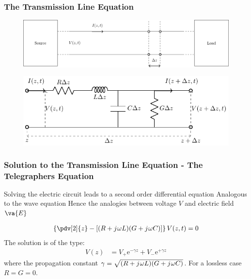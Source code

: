 \documentclass[10pt, compress]{beamer}
\renewcommand{\O}{\omega}  %
\newcommand{\e}{\mathrm{e}} %
\renewcommand{\j}{{j}\mkern1mu} %
\begin{document}
\begin{frame}
  \frametitle{The Transmission Line Equation}

\begin{figure}
  \centering
  \includegraphics[width=.85\textwidth]{tlines.pdf}
  \end{figure}
  \begin{figure}
    \centering
    \includegraphics[width=.85\textwidth]{circuit2.pdf}
      \end{figure}
\end{frame}

\begin{frame}
  \frametitle{Solution to the Transmission Line Equation - The Telegraphers Equation}
\begin{outline}
  \1 Solving the electric circuit leads to a second order differential equation
  \1 Analogous to the wave equation
  \2 Hence the analogies between voltage $V$ and electric field $\va{E}$
\end{outline}
\begin{align*}
  \left\{ \pdv[2]{z} - \left[ (R + \j \O L)( G + \j \O C)  \right] \right\} V (z,t) = 0
\end{align*}
The solution is of the type:
\begin{align*}
  V(z) &= V_{+} \e^{-\gamma z} + V_{-} \e^{+\gamma z}
\end{align*}
where the propagation constant $\gamma = \sqrt{(R + \j \O L)( G + \j \O C)}$. For a lossless case $R = G = 0$. 
\end{frame}
\end{document}
